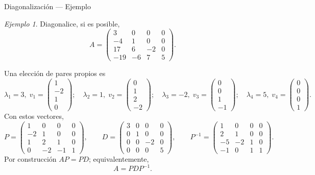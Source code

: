 \documentclass[aspectratio=169,11pt]{beamer}
\theoremstyle{remark}
\newtheorem{Ejem}[definicion]{Ejemplo}
\begin{document}
\begin{frame}[shrink=5]{Diagonalización — Ejemplo}
\footnotesize
\begin{Ejem}


Diagonalice, si es posible,
\[
A=\begin{pmatrix}3 & 0 & 0 & 0\\-4 & 1 & 0 & 0\\17 & 6 & -2 & 0\\-19 & -6 & 7 & 5\end{pmatrix}.
\]

\scriptsize
Una elección de pares propios es
\[
\lambda_1=3,\;v_1=\begin{pmatrix}1\\-2\\1\\0\end{pmatrix};\quad \lambda_2=1,\;v_2=\begin{pmatrix}0\\1\\2\\-2\end{pmatrix};\quad \lambda_3=-2,\;v_3=\begin{pmatrix}0\\0\\1\\-1\end{pmatrix};\quad \lambda_4=5,\;v_4=\begin{pmatrix}0\\0\\0\\1\end{pmatrix}.
\]
Con estos vectores,
\[
P=\begin{pmatrix}1 & 0 & 0 & 0\\-2 & 1 & 0 & 0\\1 & 2 & 1 & 0\\0 & -2 & -1 & 1\end{pmatrix},\qquad D=\begin{pmatrix}3 & 0 & 0 & 0\\0 & 1 & 0 & 0\\0 & 0 & -2 & 0\\0 & 0 & 0 & 5\end{pmatrix},\qquad P^{-1}=\begin{pmatrix}1 & 0 & 0 & 0\\2 & 1 & 0 & 0\\-5 & -2 & 1 & 0\\-1 & 0 & 1 & 1\end{pmatrix}.
\]
Por construcción $AP=PD$; equivalentemente,
\[
\boxed{A=PDP^{-1}}.
\]

\end{Ejem}
\end{frame}
\end{document}
